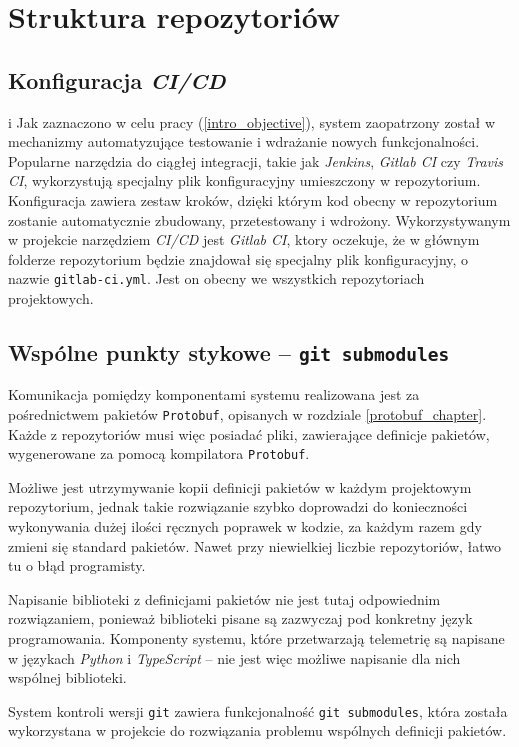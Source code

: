 \section{Struktura repozytoriów} \label{repo_structure}

\subsection{Konfiguracja \textit{CI/CD}}
i
Jak zaznaczono w celu pracy (\ref{intro_objective}), system zaopatrzony został w  
mechanizmy automatyzujące testowanie i wdrażanie nowych 
funkcjonalności. Popularne narzędzia do ciągłej integracji, takie jak
\textit{Jenkins}, \textit{Gitlab CI} czy \textit{Travis CI}, wykorzystują specjalny
plik konfiguracyjny umieszczony w repozytorium. Konfiguracja zawiera zestaw kroków,
dzięki którym kod obecny w repozytorium zostanie automatycznie
zbudowany, przetestowany i wdrożony. Wykorzystywanym w projekcie narzędziem \textit{CI/CD}
jest \textit{Gitlab CI}, ktory oczekuje, że w głównym folderze repozytorium będzie 
znajdował się specjalny plik konfiguracyjny, o nazwie \texttt{gitlab-ci.yml}. 
Jest on obecny we wszystkich repozytoriach projektowych.


\subsection{Wspólne punkty stykowe -- \texttt{git submodules}}

Komunikacja pomiędzy komponentami systemu realizowana jest za pośrednictwem
pakietów \texttt{Protobuf}, opisanych w rozdziale \ref{protobuf_chapter}.
Każde z repozytoriów musi więc posiadać pliki, zawierające definicje pakietów,
wygenerowane za pomocą kompilatora \texttt{Protobuf}. 

Możliwe jest utrzymywanie kopii definicji pakietów w każdym projektowym repozytorium,
jednak takie rozwiązanie szybko doprowadzi do konieczności wykonywania dużej ilości
ręcznych poprawek w kodzie, za każdym razem gdy zmieni się standard pakietów. 
Nawet przy niewielkiej liczbie repozytoriów, łatwo tu o błąd programisty. 

Napisanie biblioteki z definicjami pakietów nie jest tutaj odpowiednim rozwiązaniem, 
ponieważ biblioteki pisane są zazwyczaj pod konkretny język programowania. Komponenty
systemu, które przetwarzają telemetrię są napisane w językach \textit{Python} i 
\textit{TypeScript} -- nie jest więc możliwe napisanie dla nich wspólnej biblioteki.

System kontroli wersji \texttt{git} zawiera funkcjonalność
\texttt{git submodules}\cite{git_submodules}, która została wykorzystana
w projekcie do rozwiązania problemu wspólnych definicji pakietów.

